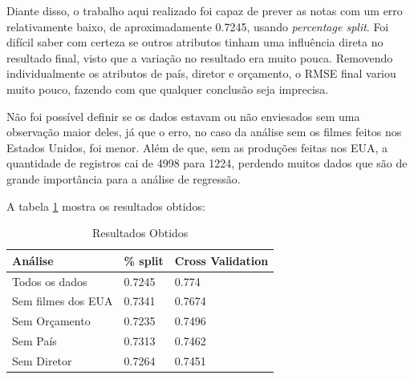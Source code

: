 Diante disso, o trabalho aqui realizado foi capaz de prever as notas com um erro relativamente baixo, de aproximadamente 0.7245, usando \textit{percentage split}. Foi difícil saber com certeza se outros atributos tinham uma influência direta no resultado final, visto que a variação no resultado era muito pouca. Removendo individualmente os atributos de país, diretor e orçamento, o RMSE final variou muito pouco, fazendo com que qualquer conclusão seja imprecisa.

Não foi possível definir se os dados estavam ou não enviesados sem uma observação maior deles, já que o erro, no caso da análise sem os filmes feitos nos Estados Unidos, foi menor. Além de que, sem as produções feitas nos EUA, a quantidade de registros cai de 4998 para 1224, perdendo muitos dados que são de grande importância para a análise de regressão.

A tabela \ref{results} mostra os resultados obtidos:

\begin{longtable}{|l|l|l|}
\caption{Resultados Obtidos}
\label{results}
\\\hline
\textbf{Análise} & \textbf{\% split} & \textbf{Cross Validation} \\ \hline
Todos os dados      & 0.7245    & 0.774               \\ \hline
Sem filmes dos EUA      & 0.7341    & 0.7674               \\ \hline
Sem Orçamento         & 0.7235     & 0.7496              \\ \hline
Sem País         & 0.7313     & 0.7462              \\ \hline
Sem Diretor         & 0.7264     & 0.7451              \\ \hline
\end{longtable}
